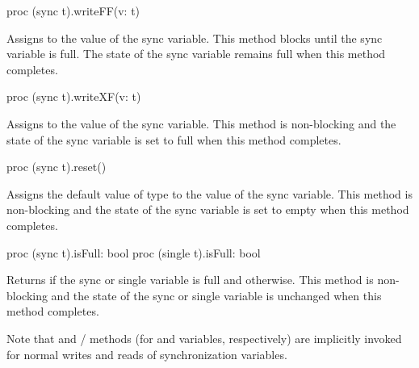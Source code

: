 \begin{protohead}
proc (sync t).writeFF(v: t)
\end{protohead}
\begin{protobody}
Assigns  to the value of the sync variable.  This method
blocks until the sync variable is full.  The state of the sync
variable remains full when this method completes.
\end{protobody}

\begin{protohead}
proc (sync t).writeXF(v: t)
\end{protohead}
\begin{protobody}
Assigns  to the value of the sync variable.  This method is
non-blocking and the state of the sync variable is set to full when
this method completes.
\end{protobody}

\begin{protohead}
proc (sync t).reset()
\end{protohead}
\begin{protobody}
Assigns the default value of type  to the value of the sync
variable.  This method is non-blocking and the state of the sync
variable is set to empty when this method completes.
\end{protobody}

\begin{protohead}
proc (sync t).isFull: bool
proc (single t).isFull: bool
\end{protohead}
\begin{protobody}
Returns  if the sync or single variable is full and 
otherwise.  This method is non-blocking and the state of the sync or single
variable is unchanged when this method completes.
\end{protobody}

Note that  and / methods
(for  and  variables, respectively) are
implicitly invoked for normal writes and reads of synchronization variables.


